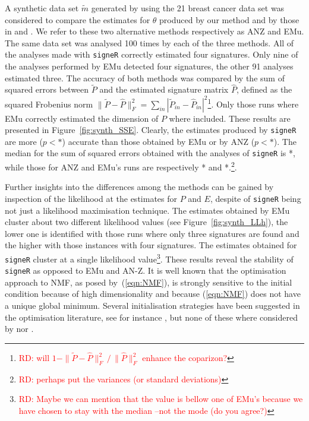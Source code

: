 \documentclass{bioinfo}
\begin{document}
A synthetic data set $\widetilde m$ generated by using the 21 breast
cancer data set was considered to compare the estimates for $\theta$
produced by our method and by those in \cite{A} and \cite{FICMV}. We
refer to these two alternative methods respectively as ANZ and EMu.
The same data set was analysed 100 times by each of the three
methods. All of the analyses made with \texttt{signeR} correctly
estimated four signatures. Only nine of the analyses performed by EMu
detected four signatures, the other 91 analyses estimated three.  The
accuracy of both methods was compared by the sum of squared errors
between $\widetilde P$ and the estimated signature matrix $\widehat
P$, defined as the squared Frobenius norm $\|\widetilde P - \widehat
P\|_F^2 = \sum_{in} |\widetilde P_{in} - \widehat
P_{in}|^2$\footnote{\textcolor{red}{RD: will $1 - \|\widetilde P -
\widehat P\|_F^2\, \big/\, \|\widehat P\|_F^2$ enhance the
coparizon?}}. Only those runs where EMu correctly estimated the
dimension of $P$ where included. These results are presented in
Figure~\ref{fig:synth_SSE}. Clearly, the estimates produced by
\texttt{signeR} are more ($p<*$) accurate than those obtained by EMu
or by ANZ ($p<*$). The median for the sum of squared errors obtained
with the analyses of \texttt{signeR} is *, while those for ANZ and
EMu's runs are respectively * and *.\footnote{\textcolor{red}{RD:
perhaps put the variances (or standard deviations)}}.

Further insights into the differences among the methods can be gained
by inspection of the likelihood at the estimates for $P$ and $E$,
despite of \texttt{signeR} being not just a likelihood maximisation
technique. The estimates obtained by EMu cluster about two different
likelihood values (see Figure~\ref{fig:synth_LLh}), the lower one is
identified with those runs where only three signatures are found and
the higher with those instances with four signatures. The estimates
obtained for \texttt{signeR} cluster at a single likelihood
value\footnote{\textcolor{red}{RD: Maybe we can mention that the value
is bellow one of EMu's because we have chosen to stay with the median
--not the mode (do you agree?)}}. These results reveal the stability
of \texttt{signeR} as opposed to EMu and AN-Z. It is well known that
the optimisation approach to NMF, as posed by~(\ref{eqn:NMF}), is
strongly sensitive to the initial condition because of high
dimensionality and because (\ref{eqn:NMF}) does not have a unique 
global minimum. Several initialisation strategies have been suggested
in the optimisation literature, see for instance \cite{LNACDarXiv,
BG, BBLPP}, but none of these where considered by \cite{FICMV} nor
\cite{A}.
\end{document}
